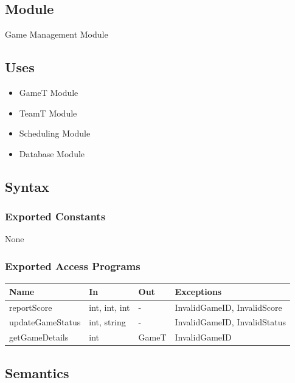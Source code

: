 \documentclass[12pt, titlepage]{article}
\begin{document}
\subsection{Module}

Game Management Module

\subsection{Uses}

\begin{itemize}
  \item GameT Module
  \item TeamT Module
  \item Scheduling Module
  \item Database Module
\end{itemize}

\subsection{Syntax}

\subsubsection{Exported Constants}

None

\subsubsection{Exported Access Programs}

\begin{center}
\begin{tabularx}{\textwidth}{|l|X|X|X|}
\hline
\textbf{Name}    & \textbf{In}   & \textbf{Out} & \textbf{Exceptions}          \\
\hline
reportScore      & int, int, int & -     & InvalidGameID, InvalidScore  \\
\hline
updateGameStatus & int, string   & -      & InvalidGameID, InvalidStatus \\
\hline
getGameDetails   & int           & GameT        & InvalidGameID                \\
\hline
\end{tabularx}
\end{center}

\subsection{Semantics}
\end{document}
